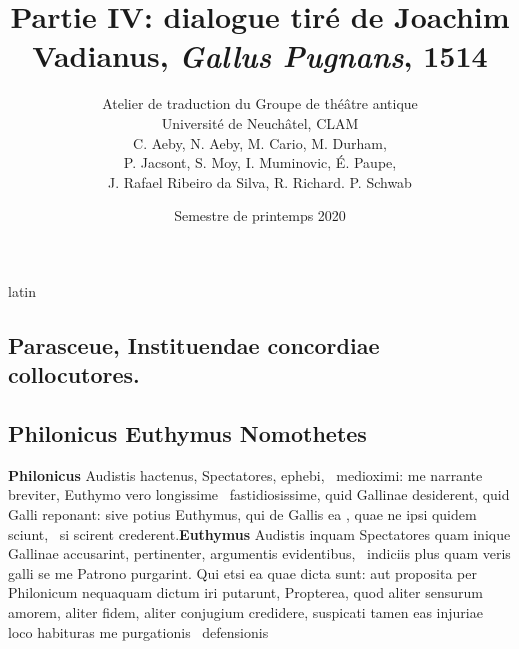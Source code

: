 \documentclass[12pt]{book}
\renewenvironment{latin}
    	{\begin{hyphenrules}{latin}}
    	{\end{hyphenrules}}
\begin{document}
        \title{Partie IV: dialogue tiré de Joachim Vadianus, \textit{Gallus Pugnans}, 1514}
        \author{Atelier de traduction du Groupe de théâtre antique\\
            Université de Neuchâtel, CLAM\\
            C. Aeby, N. Aeby, M. Cario, M. Durham,\\ 
            P. Jacsont, S. Moy, I. Muminovic, É. Paupe,\\
            J. Rafael Ribeiro da Silva, R. Richard. P. Schwab}
        \date{Semestre de printemps 2020}
        
        \maketitle
        \begin{pages}
        \begin{latin}
        \begin{Leftside}
        \beginnumbering 
            \pstart\section*{Parasceue, Instituendae concordiae collocutores.}\pend\pstart\subsection*{ Philonicus Euthymus Nomothetes}\pend\pstart\textbf{Philonicus }\hspace{1cm} Audistis hactenus, Spectatores, ephebi,  ﻿\ampersand\ medioximi: me narrante 
            breviter, Euthymo vero longissime ﻿\ampersand\ fastidiosissime, quid Gallinae desiderent, quid Galli reponant:
            sive potius Euthymus, qui de Gallis ea , quae ne ipsi quidem sciunt, ﻿\ampersand\ si scirent  crederent.\pend\pstart\textbf{Euthymus  }\hspace{1cm} Audistis inquam Spectatores quam inique Gallinae accusarint,  pertinenter, argumentis evidentibus, ﻿\ampersand\ indiciis plus quam veris galli se me Patrono
            purgarint. Qui etsi ea quae dicta sunt: aut proposita per Philonicum nequaquam dictum iri putarunt, Propterea, quod aliter sensurum amorem, aliter fidem, aliter conjugium credidere, 
            suspicati tamen  eas injuriae loco habituras me purgationis ﻿\ampersand\ defensionis

\end{Leftside}
\end{latin}
\end{pages}
\end{document}

